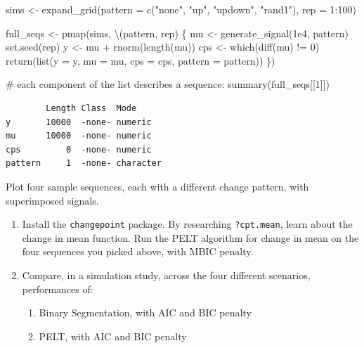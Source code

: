\documentclass[
  letterpaper,
  DIV=11,
  numbers=noendperiod]{scrreprt}
\newenvironment{Shaded}{\begin{snugshade}}{\end{snugshade}}
\newcommand{\AttributeTok}[1]{\textcolor[rgb]{0.40,0.45,0.13}{#1}}
\newcommand{\CommentTok}[1]{\textcolor[rgb]{0.37,0.37,0.37}{#1}}
\newcommand{\DecValTok}[1]{\textcolor[rgb]{0.68,0.00,0.00}{#1}}
\newcommand{\FloatTok}[1]{\textcolor[rgb]{0.68,0.00,0.00}{#1}}
\newcommand{\FunctionTok}[1]{\textcolor[rgb]{0.28,0.35,0.67}{#1}}
\newcommand{\NormalTok}[1]{\textcolor[rgb]{0.00,0.23,0.31}{#1}}
\newcommand{\OtherTok}[1]{\textcolor[rgb]{0.00,0.23,0.31}{#1}}
\newcommand{\SpecialCharTok}[1]{\textcolor[rgb]{0.37,0.37,0.37}{#1}}
\newcommand{\StringTok}[1]{\textcolor[rgb]{0.13,0.47,0.30}{#1}}
\begin{document}
\begin{Shaded}
\begin{Highlighting}[]
\NormalTok{sims }\OtherTok{\textless{}{-}} \FunctionTok{expand\_grid}\NormalTok{(}\AttributeTok{pattern =} \FunctionTok{c}\NormalTok{(}\StringTok{"none"}\NormalTok{, }\StringTok{"up"}\NormalTok{, }\StringTok{"updown"}\NormalTok{, }\StringTok{"rand1"}\NormalTok{), }\AttributeTok{rep =} \DecValTok{1}\SpecialCharTok{:}\DecValTok{100}\NormalTok{)}

\NormalTok{full\_seqs }\OtherTok{\textless{}{-}} \FunctionTok{pmap}\NormalTok{(sims, \textbackslash{}(pattern, rep) \{}
\NormalTok{  mu }\OtherTok{\textless{}{-}} \FunctionTok{generate\_signal}\NormalTok{(}\FloatTok{1e4}\NormalTok{, pattern)}
  \FunctionTok{set.seed}\NormalTok{(rep)}
\NormalTok{  y }\OtherTok{\textless{}{-}}\NormalTok{ mu }\SpecialCharTok{+} \FunctionTok{rnorm}\NormalTok{(}\FunctionTok{length}\NormalTok{(mu))}
\NormalTok{  cps }\OtherTok{\textless{}{-}} \FunctionTok{which}\NormalTok{(}\FunctionTok{diff}\NormalTok{(mu) }\SpecialCharTok{!=} \DecValTok{0}\NormalTok{)}
\FunctionTok{return}\NormalTok{(}\FunctionTok{list}\NormalTok{(}\AttributeTok{y =}\NormalTok{ y, }\AttributeTok{mu =}\NormalTok{ mu, }\AttributeTok{cps =}\NormalTok{ cps, }\AttributeTok{pattern =}\NormalTok{ pattern))}
\NormalTok{\})}

\CommentTok{\# each component of the list describes a sequence:}
\FunctionTok{summary}\NormalTok{(full\_seqs[[}\DecValTok{1}\NormalTok{]])}
\end{Highlighting}
\end{Shaded}

\begin{verbatim}
        Length Class  Mode     
y       10000  -none- numeric  
mu      10000  -none- numeric  
cps         0  -none- numeric  
pattern     1  -none- character
\end{verbatim}

Plot four sample sequences, each with a different change pattern, with
superimposed signals.

\begin{enumerate}
\def\labelenumi{\arabic{enumi}.}
\setcounter{enumi}{1}
\item
  Install the \texttt{changepoint} package. By researching
  \texttt{?cpt.mean}, learn about the change in mean function. Run the
  PELT algorithm for change in mean on the four sequences you picked
  above, with MBIC penalty.
\item
  Compare, in a simulation study, across the four different scenarios,
  performances of:

  \begin{enumerate}
  \def\labelenumii{\alph{enumii}.}
  \item
    Binary Segmentation, with AIC and BIC penalty
  \item
    PELT, with AIC and BIC penalty
  \end{enumerate}
\end{enumerate}
\end{document}
